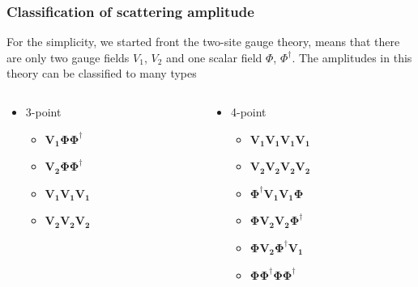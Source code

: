 \documentclass{beamer}
\begin{document}
\begin{frame}
    \frametitle{Classification of scattering amplitude}
    For the simplicity, we started front the two-site gauge theory, means that there are only two gauge fields $V_1$, $V_2$ and one scalar field $\Phi$, $\Phi^\dagger$.
    The amplitudes in this theory can be classified to many types
    \begin{columns}[T]
        \begin{column}{0.48\textwidth}
            \begin{itemize}
                \item 3-point
                    \begin{itemize}
                        \item $\bm{V_1\Phi\Phi^\dagger}$
                        \item $\bm{V_2\Phi\Phi^\dagger}$
                        \item $\bm{V_1V_1V_1}$
                        \item $\bm{V_2V_2V_2}$
                    \end{itemize}
            \end{itemize}
        \end{column}
        \begin{column}{0.48\textwidth}
            \begin{itemize}
                \item 4-point
                \begin{itemize}
                    \item $\bm{V_1V_1V_1V_1}$
                    \item $\bm{V_2V_2V_2V_2}$
                    \item $\bm{\Phi^\dagger V_1V_1\Phi}$
                    \item $\bm{\Phi V_2V_2\Phi^\dagger}$
                    \item $\bm{\Phi V_2 \Phi^\dagger V_1}$
                    \item $\bm{\Phi\Phi^\dagger\Phi\Phi^\dagger}$
                \end{itemize}
            \end{itemize}
        \end{column}
    \end{columns}
\end{frame}
\end{document}
